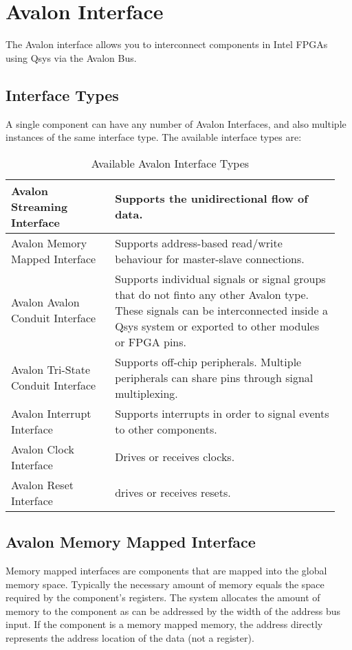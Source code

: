 \section{Avalon Interface}
	The Avalon interface allows you to interconnect components in Intel FPGAs using Qsys via the Avalon Bus.
	
	\subsection{Interface Types }
		A single component can have any number of Avalon Interfaces, and also multiple instances of the same interface type. The available interface types are:
		\begin{table}[H]
			\centering
			\begin{tabular}{|p{0.3\linewidth}|p{0.65\linewidth}|}
				\hline
				Avalon Streaming Interface
					& Supports the unidirectional flow of data.\\
				\hline
				Avalon Memory Mapped Interface
					& Supports address-based read/write behaviour for master-slave connections.\\
				\hline
				Avalon Avalon Conduit Interface
					& Supports individual signals or signal groups that do not finto any other Avalon type.
					These signals can be interconnected inside a Qsys system or exported to other modules or FPGA pins.\\
				\hline
				Avalon Tri-State Conduit Interface
					& Supports off-chip peripherals. Multiple peripherals can share pins through signal multiplexing.\\
				\hline
				Avalon Interrupt Interface
					& Supports interrupts in order to signal events to other components.\\
				\hline
				Avalon Clock Interface
					& Drives or receives clocks.\\
				\hline
				Avalon Reset Interface
					& drives or receives resets.\\
				\hline	
			\end{tabular}
			\caption{Available Avalon Interface Types}
		\end{table}
		
	\subsection{Avalon Memory Mapped Interface }
		Memory mapped interfaces are components that are mapped into the global memory space. Typically the necessary amount of memory equals the space required by the component's registers. The system allocates the amount of memory to the component as can be addressed by the width of the address bus input. If the component is a memory mapped memory, the address directly represents the address location of the data (not a register).
		
